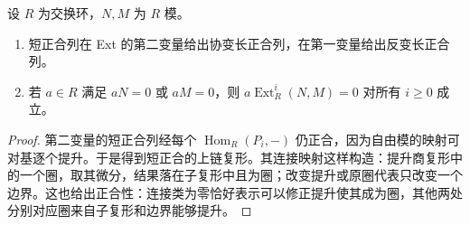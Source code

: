 \begin{lemma}\label{b3:lem:ext-basic-properties}
	设 \(R\) 为交换环，\(N,M\) 为 \(R\) 模。
	\begin{enumerate}
		\item 短正合列在 Ext 的第二变量给出协变长正合列，在第一变量给出反变长正合列。
		\item 若 \(a\in R\) 满足 \(aN=0\) 或 \(aM=0\)，则 \(a\operatorname{Ext}_R^i(N,M)=0\) 对所有 \(i\ge0\) 成立。
	\end{enumerate}
\end{lemma}
\begin{proof}
	第二变量的短正合列经每个 \(\operatorname{Hom}_R(P_i,-)\) 仍正合，因为自由模的映射可对基逐个提升。于是得到短正合的上链复形。其连接映射这样构造：提升商复形中的一个圈，取其微分，结果落在子复形中且为圈；改变提升或原圈代表只改变一个边界。这也给出正合性：连接类为零恰好表示可以修正提升使其成为圈，其他两处分别对应圈来自子复形和边界能够提升。


\end{proof}
